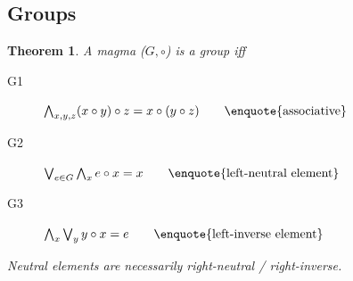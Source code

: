 \documentclass[a4paper,landscape,twocolumn]{article}
\newtheorem{theorem}{Theorem}[section]
\begin{document}
\subsection{Groups}

\begin{theorem}
  A magma ($G, \circ$) is a group iff
  \begin{description}
    \item[G1] $\bigwedge_{x,y,z} (x \circ y) \circ z = x \circ (y \circ z) \hspace{20pt} \text{\enquote{associative}}$
    \item[G2] $\bigvee_{e \in G} \bigwedge_{x} e \circ x = x \hspace{20pt} \text{\enquote{left-neutral element}}$
    \item[G3] $\bigwedge_x \bigvee_y y \circ x = e \hspace{20pt} \text{\enquote{left-inverse element}}$
  \end{description}
  Neutral elements are necessarily right-neutral / right-inverse.
\end{theorem}
\end{document}
